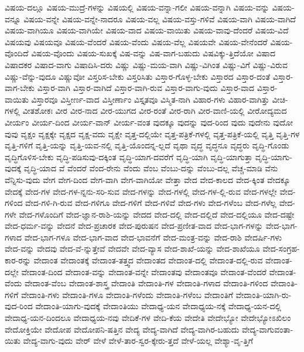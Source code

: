 {ವಿಷಯ-ದಲ್ಲೂ
ವಿಷಯ-ಮುದ್ರೆ-ಗಳನ್ನು
ವಿಷಯಲ್ಲಿ
ವಿಷಯ-ವನ್ನಾ-ಗಲೀ
ವಿಷಯ-ವನ್ನಾಗಿ
ವಿಷಯ-ವನ್ನು
ವಿಷಯ-ವನ್ನೂ
ವಿಷಯ-ವನ್ನೇ
ವಿಷಯ-ವನ್ನೇ-ನಾದರೂ
ವಿಷಯ-ವಲ್ಲ
ವಿಷಯ-ವಸ್ತು-ಗಳಿವೆ
ವಿಷಯ-ವಾಗಿ
ವಿಷಯ-ವಾಗಿದೆ
ವಿಷಯ-ವಾಗಿಯೂ
ವಿಷಯ-ವಾಗಿಯೇ
ವಿಷಯ-ವಾದ
ವಿಷಯ-ವಾಯಿತು
ವಿಷಯ-ವಾವು-ದೆಂದರೆ
ವಿಷಯ-ವಿದೆ
ವಿಷಯವು
ವಿಷಯವೂ
ವಿಷಯ-ವೆಂದರೆ
ವಿಷಯ-ವೆಂದು
ವಿಷಯ-ವೆಲ್ಲ
ವಿಷಯವೇ
ವಿಷಯ-ವೇನೆಂದರೆ
ವಿಷಯ-ವೊಂದಿದೆ
ವಿಷಯ-ವೊಂದು
ವಿಷಯ-ಸುಖಕ್ಕೆ
ವಿಷ-ವನ್ನು
ವಿಷ-ವಾಗ-ಬಹುದು
ವಿಷವಿಕ್ಕು-ತ್ತಿದೆಯೋ
ವಿಷಾದ
ವಿಷಾದಕರ
ವಿಷಾದ-ವಾಗು
ವಿಷಾದಿಸಿ-ದರು
ವಿಷ್ಣು
ವಿಷ್ಣು-ಮಯ-ವಾಗಿ
ವಿಷ್ಣು-ವಿಗಿಂತ
ವಿಷ್ಣು-ವಿಗೆ
ವಿಷ್ಣು-ವಿರುವ
ವಿಷ್ಣು-ವೆನ್ನು-ವುದೂ
ವಿಷ್ಣುವೋ
ವಿಸ್ತರಿಸ-ಬೇಕು
ವಿಸ್ತರಿಸಿತು
ವಿಸ್ತಾರ-ಗೊಳ್ಳ-ಬೇಕು
ವಿಸ್ತಾರದ
ವಿಸ್ತಾರ-ದಂತೆ
ವಿಸ್ತಾರ-ವಾಗ-ಬೇಕು
ವಿಸ್ತಾರ-ವಾಗಿ
ವಿಸ್ತಾರ-ವಾಗಿದೆ
ವಿಸ್ತಾರ-ವಾಗಿ-ರುವ
ವಿಸ್ತಾರ-ವಾಗು-ವುದು
ವಿಸ್ತಾರ-ವಾದ
ವಿಸ್ತಾರ-ವಾಯಿತು
ವಿಸ್ತಾರವೂ
ವಿಸ್ತೀರ್ಣ-ವಾದ
ವಿಸ್ತೀರ್ಣಾಂ
ವಿಸ್ತೃತವೂ
ವಿಸ್ಮಿತ-ನಾಗಿ
ವಿಹಾರ-ಗಳು
ವಿಹಾರ-ವಾಗಿತ್ತು
ವೀಚಿ-ಗಳಲ್ಲಿ
ವೀತಶೋಕಃ
ವೀರ
ವೀರ-ನಾದ
ವೀರ-ಯುಗದ
ವೀರ-ರಂತೆ
ವೀರ-ರಾಗಿ
ವೀರ-ವಾಣಿ-ಯಲ್ಲಿ
ವೀರೋದ್ಯಮದ
ವೀರ್ಯಂ
ವೀರ್ಯ-ದಿಂದ
ವೀರ್ಯ-ವಾನ್
ವೀರ್ಯ-ವಂತ
ವುದಕ್ಕೂ
ವುದನ್ನು
ವುದ-ರಿಂದ
ವುದು
ವುದೇನು
ವುದೋ
ವುವು
ವೃಕ್ಷಂ
ವೃಕ್ಷಕ್ಕೇ
ವೃಕ್ಷದ
ವೃಕ್ಷ-ವದು
ವೃಕ್ಷೇ
ವೃತ್ತ-ದಲ್ಲಿಯೇ
ವೃತ್ತ-ಪತ್ರಿಕೆ-ಗಳಲ್ಲಿ
ವೃತ್ತ-ಪತ್ರಿಕೆ-ಯಲ್ಲಿ
ವೃತ್ತಿ
ವೃತ್ತಿ-ಗಳ
ವೃತ್ತಿ-ಗಳಿಗೆ
ವೃತ್ತಿ-ಯನ್ನು
ವೃತ್ತಿ-ಯವ-ನಲ್ಲಿ
ವೃತ್ತಿ-ಯೊಂದನ್ನ-ಲ್ಲದೆ
ವೃಥಾ
ವೃದ್ಧ
ವೃದ್ಧನೂ
ವೃದ್ಧರು
ವೃದ್ಧಿ-ಗೊಂಡು
ವೃದ್ಧಿಗೊಳಿಸ-ಬೇಕು
ವೃದ್ಧಿ-ಪಡಿಸುವು-ದಕ್ಕಿಂತ
ವೃದ್ಧಿ-ಯಾಗ-ದವರೆಗೆ
ವೃದ್ಧಿ-ಯಾಗಿ
ವೃದ್ಧಿ-ಯಾಗುತ್ತಾ
ವೃದ್ಧಿ-ಯಾಗು-ವುದಕ್ಕೆ
ವೃದ್ಧಿ-ಯಾದ
ವೆ
ವೆಂದರೆ
ವೆಂದ-ರೇನು
ವೆಂದು
ವೆಂಬ
ವೆಂಬು-ದನ್ನು
ವೆಂಬು-ದಲ್ಲ
ವೆಚ್ಚ-ಮಾಡಿ
ವೆನು
ವೆನ್ನಿಸು-ವುದು
ವೇಗ
ವೇಗ-ದಿಂದ
ವೇಗ-ವಾಗಿ
ವೇಗ-ವಾಗಿಯೋ
ವೇತ್ತಾ
ವೇದ
ವೇದ-ಕಾಲದ
ವೇದ-ಕ್ಕಿಂತ
ವೇದಕ್ಕೂ
ವೇದಕ್ಕೆ
ವೇದ-ಗಳ
ವೇದ-ಗಳ-ನ್ನನು-ಸರಿ-ಸುವ
ವೇದ-ಗಳನ್ನು
ವೇದ-ಗಳಲ್ಲಿ
ವೇದ-ಗಳ-ಲ್ಲಿ-ರುವ
ವೇದ-ಗಳಲ್ಲೇ
ವೇದ-ಗಳಿಂದ
ವೇದ-ಗಳಿ-ಗಿ-ರುವ
ವೇದ-ಗಳಿಗೂ
ವೇದ-ಗಳಿಗೆ
ವೇದ-ಗಳಿವೆ
ವೇದ-ಗಳು
ವೇದ-ಗಳೆಂಬ
ವೇದ-ಗಳೆಲ್ಲ
ವೇದ-ಗಳೇ
ವೇದ-ಗಳೊಂದಿಗೆ
ವೇದ-ಜ್ಞಾನ-ರಾಶಿ-ಯನ್ನು
ವೇದದ
ವೇದ-ದಲ್ಲಿ
ವೇದ-ದಲ್ಲಿದೆ
ವೇದ-ದಲ್ಲಿಯೂ
ವೇದ-ದಷ್ಟೇ
ವೇದ-ಧರ್ಮ-ವನ್ನು
ವೇದನೆ
ವೇದ-ಪ್ರಚಾರಕ
ವೇದ-ಪುರುಷನ
ವೇದ-ಪ್ರಣೀತ-ವಾದ
ವೇದ-ಭಾಗ-ಗಳನ್ನು
ವೇದ-ಭಾಗ-ಗಳಾದ
ವೇದ-ಭಾಗ-ಗಳೂ
ವೇದ-ಭಾಗ-ವಾದ
ವೇದ-ಭಾವನೆಗೆ
ವೇದ-ಮಂತ್ರ-ವನ್ನು
ವೇದ-ರಾಶಿ
ವೇದರ್ಷಿ-ಗಳು
ವೇದ-ವನ್ನು
ವೇದವು
ವೇದ-ವೆ-ನ್ನುತ್ತೇವೆ
ವೇದವೇ
ವೇದ-ವ್ಯಾಸ
ವೇದ-ಶಾಖೆ-ಯನ್ನು
ವೇದ-ಶಾಖೆಯೂ
ವೇದ-ಸಂಗ್ರಹ-ಕಾರ-ರನ್ನು
ವೇದಾಂತ
ವೇದಾಂತಕ್ಕೆ
ವೇದಾಂತ-ತತ್ತ್ವದ
ವೇದಾಂತದ
ವೇದಾಂತ-ದಲ್ಲಿ
ವೇದಾಂತ-ದಲ್ಲಿ-ರುವ
ವೇದಾಂತ-ದಲ್ಲೇ
ವೇದಾಂತ-ದಿಂದ
ವೇದಾಂತ-ವನ್ನು
ವೇದಾಂತ-ವನ್ನೇ
ವೇದಾಂತವು
ವೇದಾಂತವೂ
ವೇದಾಂತ-ವೆಂದರೆ
ವೇದಾಂತ-ವೆಂದು
ವೇದಾಂತ-ವೆಂಬ
ವೇದಾಂತ-ಶಾಸ್ತ್ರ
ವೇದಾಂತಿ
ವೇದಾಂತಿ-ಗಳ
ವೇದಾಂತಿ-ಗಳಾದ
ವೇದಾಂತಿ-ಗಳಿಂದ
ವೇದಾಂತಿ-ಗಳಿಗೆ
ವೇದಾಂತಿ-ಗಳು
ವೇದಾಂತಿ-ಗಳೂ
ವೇದಾಂತಿ-ಗಳೆಂದು
ವೇದಾಂತಿ-ಗಳೆಂಬ
ವೇದಾಂತಿಗೆ
ವೇದಾಂತಿ-ಯಾಗಿ-ರು-ವುದ-ರಿಂದ
ವೇದಾಂತಿ-ಯಾಗು-ವುದಕ್ಕೆ
ವೇದಾಂತಿಯು
ವೇದಾಧ್ಯ-ಯನ
ವೇದಾಧ್ಯಯ-ನಕ್ಕೆ
ವೇದಾಧ್ಯ-ಯನ-ದಲ್ಲಿ
ವೇದಾಧ್ಯ-ಯನ-ದಿಂದಲೂ
ವೇದಾಧ್ಯಯ-ನವು
ವೇದಿಕೆ-ಗಳ
ವೇದಿ-ಕೆಯ
ವೇದೇತಿ
ವೇದೇಭ್ಯೋ
ವೇದೇಭ್ಯೋಽಖಿಲಂ
ವೇದೋಕ್ತಿಯೇ
ವೇದೋಪ
ವೇದೋಪನಿ-ಷತ್ತಿನ
ವೇದ್ಯ
ವೇದ್ಯ-ವಾಗಿದೆ
ವೇದ್ಯ-ವಾಗಿರ-ಬಹುದು
ವೇದ್ಯ-ವಾಗುವಂತಾ-ಯಿತು
ವೇದ್ಯ-ವಾಗು-ವುದು
ವೇರ್
ವೇಳೆ
ವೇಳೆ-ತಾರ-ಸ್ವರ-ಕ್ಕೇರು-ತ್ತದೆ
ವೇಳೆ-ಯಲ್ಲ
ವೇಶ್ಯಾ-ವೃ-ತ್ತಿಗೆ
}

